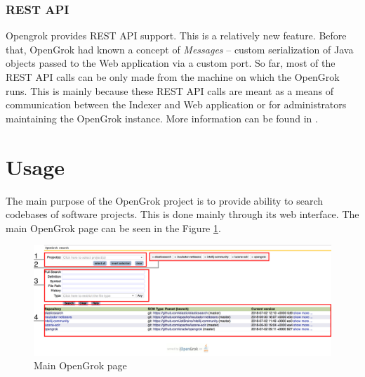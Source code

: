 \subsubsection{REST API}
\label{opengrok_rest}

Opengrok provides REST API support. This is a relatively new feature. Before that, OpenGrok had known a concept of
\textit{Messages} – custom serialization of Java objects passed to the Web application via a custom port.
So far, most of the REST API calls can be only made from the machine on which the OpenGrok runs.
This is mainly because these REST API calls are meant as a means of communication between the Indexer and Web application
or for administrators maintaining the OpenGrok instance. More information can be found in \citep{web_services_wiki}.

\section{Usage}
\label{opengrok_usage}
The main purpose of the OpenGrok project is to provide ability to search codebases of software projects. This is done
mainly through its web interface. The main OpenGrok page can be seen in the Figure \ref{opengrok_main}.

\begin{figure}[htbp]
    \centering
    \includegraphics[width=145mm]{../img/opengrok_main.png}
    \caption{Main OpenGrok page}
    \label{opengrok_main}
\end{figure}

